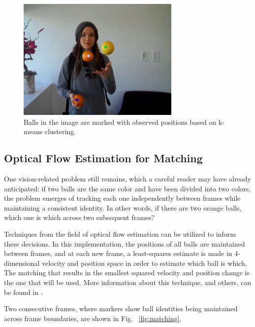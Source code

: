 \documentclass[letterpaper, 10 pt, conference]{ieeeconf}  %
\begin{document}
\begin{figure}
\centering
    \includegraphics{clusters.png}
    \caption{Balls in the image are marked with observed positions based on k-means clustering.}
    \label{fig:clusters}
\end{figure}

\subsection{Optical Flow Estimation for Matching}

One vision-related problem still remains, which a careful reader may have already anticipated: if two balls are the same color and have been divided into two colors, the problem emerges of tracking each one independently between frames while maintaining a consistent identity. In other words, if there are two orange balls, which one is which across two subsequent frames?

Techniques from the field of optical flow estimation can be utilized to inform these decisions. In this implementation, the positions of all balls are maintained between frames, and at each new frame, a least-squares estimate is made in 4-dimensional velocity and position space in order to estimate which ball is which. The matching that results in the smallest squared velocity and position change is the one that will be used. More information about this technique, and others, can be found in \cite{fleet}.

Two consecutive frames, where markers show ball identities being maintained across frame boundaries, are shown in Fig.~ \ref{fig:matching}.
\end{document}
